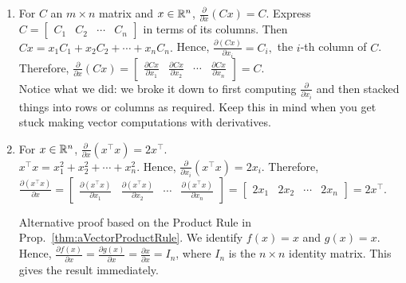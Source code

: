 \begin{enumerate}
\renewcommand{\labelenumi}{(\alph{enumi})}
\setlength{\itemsep}{.2cm}
\item For $C$ an $m \times n$ matrix and $x \in \mathbb R^{n}$, $\frac{\partial }{\partial x} \left( C  x \right) = C$. Express  $C = \left[ \begin{array}{cccc} C_1 & C_2 & \cdots & C_n \end{array} \right]$ in terms of its columns. Then $ C x = x_1 C_1 + x_2 C_2 + \cdots + x_n C_n.$
Hence, 
$\frac{\partial (Cx)}{\partial x_i} = C_i,$
the $i$-th column of $C$. Therefore, 
$ \frac{\partial }{\partial x} \left( C  x \right) = \left[ \begin{array}{cccc} \frac{\partial Cx}{\partial x_1}  & \frac{\partial Cx}{\partial x_2} & \cdots & \frac{\partial Cx}{\partial x_n} \end{array} \right] = C.$\\

Notice what we did: we broke it down to first computing $\frac{\partial }{\partial x_i}$ and then stacked things into rows or columns as required. Keep this in mind when you get stuck making vector computations with derivatives.

\item For $x \in \mathbb R^{n}$, $ \frac{\partial~ }{\partial x} \left(x^\top x\right) = 2 x ^\top $.\\



$x^\top x = x_1^2 + x_2 ^2 + \cdots + x_n^2$. Hence, $\frac{\partial }{\partial x_i}\left( x^\top x\right) = 2 x_i$. Therefore, $\frac{\partial \left( x^\top x\right)}{\partial x} = \left[ \begin{array}{cccc} \frac{\partial \left( x^\top x\right)}{\partial x_1}  & \frac{\partial \left( x^\top x\right)}{\partial x_2} & \cdots & \frac{\partial \left( x^\top x\right)}{\partial x_n} \end{array} \right] = \left[ \begin{array}{cccc}2 x_1  &  2x_2  & \cdots &  2x_n \end{array} \right] = 2 x^\top$.

Alternative proof based on the Product Rule in Prop.~\ref{thm:aVectorProductRule}. We identify $f(x) = x$ and $g(x) = x.$ Hence, $\frac{\partial f(x)}{\partial x} = \frac{\partial g(x)}{\partial x} = \frac{\partial x}{\partial x} =I_n$, where $I_n$ is the $n \times n$ identity matrix. This gives the result immediately.


\end{enumerate}
